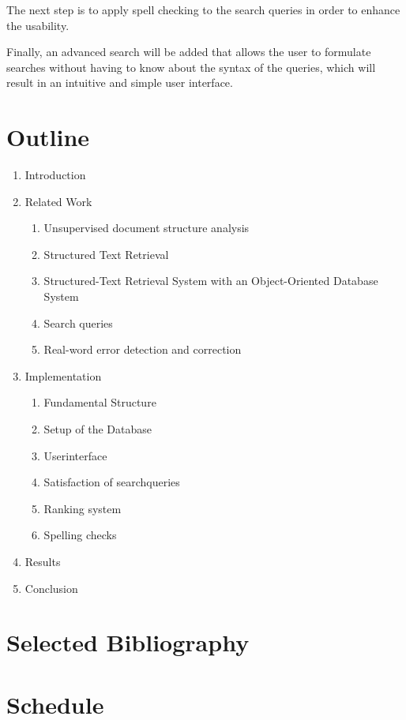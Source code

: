 \documentclass[a4paper, 12pt]{scrartcl}
\begin{document}
The next step is to apply spell checking to the search queries in order to enhance the usability.

Finally, an advanced search will be added that allows the user to formulate searches without having to know about the syntax of the queries, which will result in
an intuitive and simple user interface.

\section{Outline}

\begin{enumerate}
 \item Introduction
 \item Related Work
 \begin{enumerate}
  \item Unsupervised document structure analysis
  \item Structured Text Retrieval
  \item Structured-Text Retrieval System with an Object-Oriented Database System
  \item Search queries
  \item Real-word error detection and correction
 \end{enumerate}
 \item Implementation
 \begin{enumerate}
  \item Fundamental Structure
  \item Setup of the Database
  \item Userinterface
  \item Satisfaction of searchqueries
  \item Ranking system
  \item Spelling checks
 \end{enumerate}
 \item Results
 \item Conclusion
\end{enumerate}

\section{Selected Bibliography}


\nocite{*}

\section{Schedule}
\end{document}
